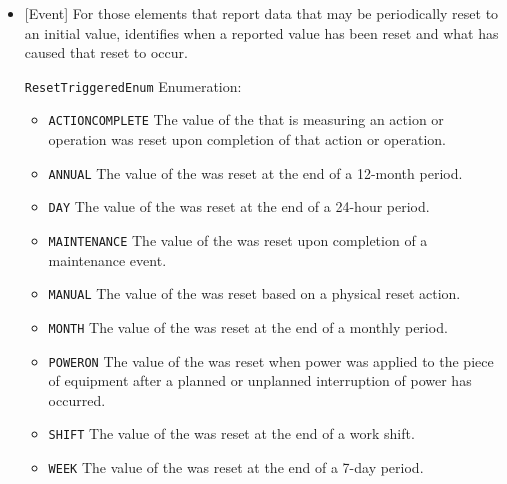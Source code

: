 \begin{itemize}

\item {}[Event] \newline For those  elements that report data that may be periodically reset to an initial value,  identifies when a reported value has been reset and what has caused that reset to occur.

\texttt{ResetTriggeredEnum} Enumeration:

\begin{itemize}
\item \texttt{ACTION\textunderscore COMPLETE} \newline The value of the  that is measuring an action or operation was reset upon completion of that action or operation. 
\item \texttt{ANNUAL} \newline The value of the  was reset at the end of a 12-month period. 
\item \texttt{DAY} \newline The value of the  was reset at the end of a 24-hour period. 
\item \texttt{MAINTENANCE} \newline The value of the  was reset upon completion of a maintenance event. 
\item \texttt{MANUAL} \newline The value of the  was reset based on a physical reset action. 
\item \texttt{MONTH} \newline The value of the  was reset at the end of a monthly period. 
\item \texttt{POWER\textunderscore ON} \newline The value of the  was reset when power was applied to the piece of equipment after a planned or unplanned interruption of power has occurred. 
\item \texttt{SHIFT} \newline The value of the  was reset at the end of a work shift. 
\item \texttt{WEEK} \newline The value of the  was reset at the end of a 7-day period. 
\end{itemize}

\end{itemize}



